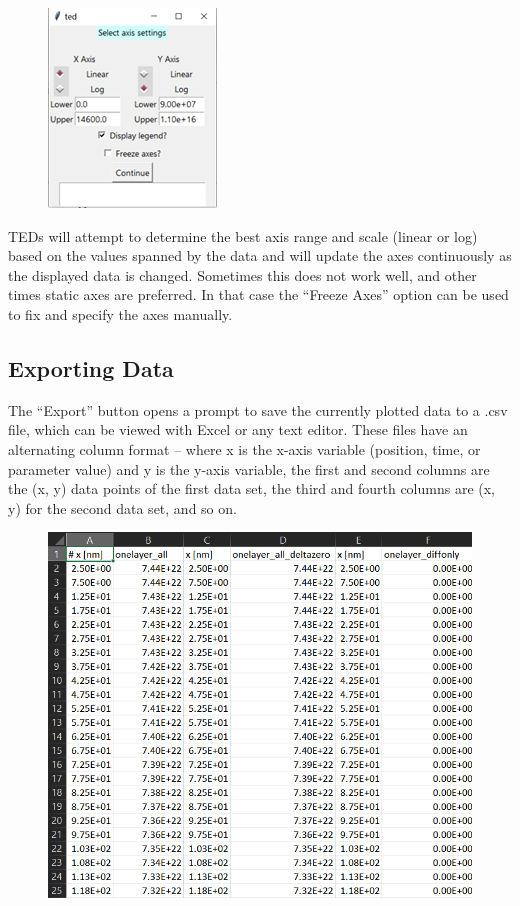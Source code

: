 \documentclass[11pt,letterpaper,titlepage]{article}
\begin{document}
		\begin{figure}[H]
			\label{fig:axis_settings_example}
			\centering
			\includegraphics[scale=1.2]{"axis_settings_example"}
		\end{figure}
	
		\par TEDs will attempt to determine the best axis range and scale (linear or log) based on the values spanned by the data and will update the axes continuously as the displayed data is changed. Sometimes this does not work well, and other times static axes are preferred. In that case the “Freeze Axes” option can be used to fix and specify the axes manually.
		
		\subsection {Exporting Data}
		
		\par The “Export” button opens a prompt to save the currently plotted data to a .csv file, which can be viewed with Excel or any text editor. These files have an alternating column format – where x is the x-axis variable (position, time, or parameter value) and y is the y-axis variable, the first and second columns are the (x, y) data points of the first data set, the third and fourth columns are (x, y) for the second data set, and so on.
		
		\begin{figure}[H]
			\label{fig:export_example}
			\centering
			\includegraphics[scale=0.8]{"export_example"}
		\end{figure}
	
\end{document}
